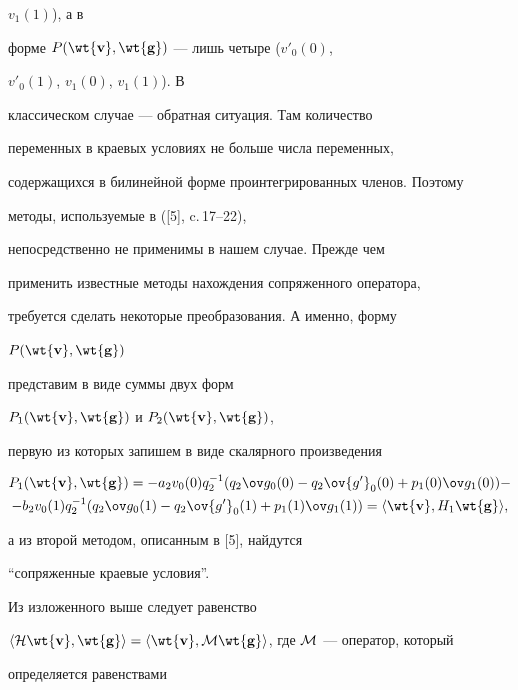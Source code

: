 $v_1(1)$), а в  


форме $P(\wt{\bold v},\wt{\bold g})$ --- лишь четыре ($v'_0(0)$, 


$v'_0(1)$, $v_1(0)$, $v_1(1)$). В  


классическом случае --- обратная ситуация. Там количество  


переменных в краевых условиях не больше числа переменных,  


содержащихся в билинейной форме проинтегрированных членов. Поэтому  


методы, используемые в ([5], c.\,17--22),


непосредственно не применимы в нашем случае. Прежде чем  


применить известные методы нахождения сопряженного оператора,  


требуется сделать некоторые преобразования. А именно, форму  


$P(\wt{\bold v},\wt{\bold g})$ 


представим в виде суммы двух форм 


$P_1(\wt{\bold v},\wt{\bold g})$ и $P_2(\wt{\bold v},\wt{\bold g})$, 


первую из которых запишем в виде скалярного произведения


\begin{multline*} 


P_1(\wt{\bold v},\wt{\bold g})=-a_2v_0(0)q^{-1}_2(q_2\ov g_0(0)- 


q_2\ov{g'}_0(0)+p_1(0)\ov g_1(0))- \\ 


% 


-b_2v_0(1)q^{-1}_2(q_2\ov g_0(1)-q_2\ov{g'}_0(1)+ 


p_1(1)\ov g_1(1))=\la\wt{\bold v},H_1\wt{\bold g}\ra, 


\end{multline*} 


а из второй методом, описанным в [5], найдутся  


``сопряженные краевые условия''. 


 


Из изложенного выше следует равенство  


$\la\cal H\wt{\bold v},\wt{\bold g}\ra=\la\wt{\bold v},\cal M\wt{\bold 


g}\ra$, где $\cal M$ --- оператор, который 


определяется равенствами 


$$ 


